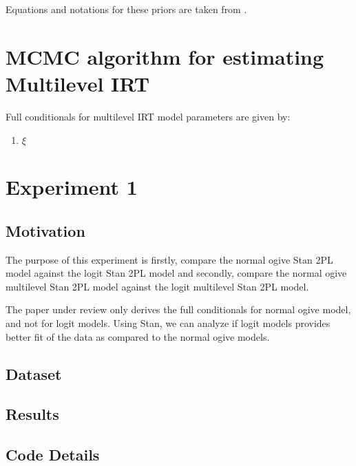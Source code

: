 \documentclass[12pt]{article}
\begin{document}
Equations and notations for these priors are taken from \cite{fox2007multilevel}.

\section{MCMC algorithm for estimating Multilevel IRT}  \label{sec:full_conditionals_mlirt}
Full conditionals for multilevel IRT model parameters are given by:
\begin{enumerate}
    \item $\xi$
\end{enumerate}

\section{Experiment 1}
\subsection{Motivation}
The purpose of this experiment is firstly, compare the normal ogive Stan 2PL model against the logit Stan 2PL model and secondly, compare the normal ogive multilevel Stan 2PL model against the logit multilevel Stan 2PL model.

The paper under review \cite{fox2001bayesian} only derives the full conditionals for normal ogive model, and not for logit models. Using Stan, we can analyze if logit models provides better fit of the data as compared to the normal ogive models.

\subsection{Dataset}

\subsection{Results}

\subsection{Code Details}







\end{document}
